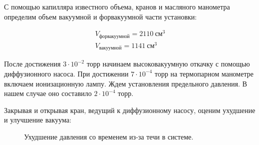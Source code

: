 \documentclass[a4paper,12pt]{report}
\begin{document}
    \begin{multicols}{2}
        С помощью капилляра известного объема, кранов и масляного манометра определим объем вакуумной и форвакуумной части установки:

        \begin{gather*}
            V_\text{форвакуумной}=2110 \  \text{см}^3\\
            V_\text{вакуумной}=1141 \ \text{см}^3
        \end{gather*}

        После достижения $3\cdot 10^{-2}$ торр начинаем высоковакуумную откачку с помощью диффузионного насоса. При достижении $7\cdot 10^{-4}$ торр на термопарном манометре включаем ионизационную лампу. Ждем установления предельного давления. В нашем случае оно составило $2\cdot 10^{-4}$ торр.

        Закрывая и открывая кран, ведущий к диффузионному насосу, оценим ухудшение и улучшение вакуума:

        \begin{figure}[H]
            \centering
            \caption{Ухудшение давления со временем из-за течи в системе.}
            \label{fig:1}
        \end{figure}


\end{multicols}
\end{document}
